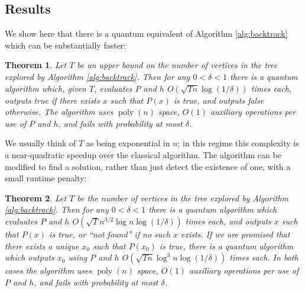 \documentclass[11pt]{article}
\DeclareMathOperator{\poly}{poly}
\newtheorem{thm}{Theorem}
\begin{document}



\subsection{Results}

We show here that there is a quantum equivalent of Algorithm \ref{alg:backtrack} which can be substantially faster:

\begin{thm}
\label{thm:detectbound}
Let $T$ be an upper bound on the number of vertices in the tree explored by Algorithm \ref{alg:backtrack}. Then for any $0 < \delta < 1$ there is a quantum algorithm which, given $T$, evaluates $P$ and $h$ $O(\sqrt{Tn} \log (1/\delta))$ times each, outputs true if there exists $x$ such that $P(x)$ is true, and outputs false otherwise. The algorithm uses $\poly(n)$ space, $O(1)$ auxiliary operations per use of $P$ and $h$, and fails with probability at most $\delta$.
\end{thm}

We usually think of $T$ as being exponential in $n$; in this regime this complexity is a near-quadratic speedup over the classical algorithm. The algorithm can be modified to find a solution, rather than just detect the existence of one, with a small runtime penalty:

\begin{thm}
\label{thm:findbound}
Let $T$ be the number of vertices in the tree explored by Algorithm \ref{alg:backtrack}. Then for any $0 < \delta < 1$ there is a quantum algorithm which evaluates $P$ and $h$ $O(\sqrt{T}n^{3/2} \log n \log (1/\delta))$ times each, and outputs $x$ such that $P(x)$ is true, or ``not found'' if no such $x$ exists. If we are promised that there exists a unique $x_0$ such that $P(x_0)$ is true, there is a quantum algorithm which outputs $x_0$ using $P$ and $h$ $O(\sqrt{Tn} \log^3 n \log(1/\delta))$ times each. In both cases the algorithm uses $\poly(n)$ space, $O(1)$ auxiliary operations per use of $P$ and $h$, and fails with probability at most $\delta$.
\end{thm}
\end{document}
